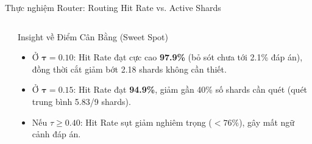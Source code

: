 \documentclass[aspectratio=169,10pt]{beamer}
\begin{document}
\begin{frame}{Thực nghiệm Router: Routing Hit Rate vs. Active Shards}
\small
\begin{columns}[T]
\begin{column}{0.55\textwidth}
\begin{table}[h]
\centering
{}
\caption{Bảng đánh giá Tradeoff giữa Routing Hit Rate và Không gian Shard kích hoạt.}
\end{table}
\end{column}

\begin{column}{0.43\textwidth}
\begin{block}{Insight về Điểm Cân Bằng (Sweet Spot)}
\begin{itemize}
    \item Ở $\mathbf{\tau=0.10}$: Hit Rate đạt cực cao \textbf{97.9\%} (bỏ sót chưa tới 2.1\% đáp án), đồng thời cắt giảm bớt 2.18 shards không cần thiết.
    \item Ở $\mathbf{\tau=0.15}$: Hit Rate đạt \textbf{94.9\%}, giảm gần 40\% số shards cần quét (quét trung bình 5.83/9 shards).
    \item Nếu $\tau \ge 0.40$: Hit Rate sụt giảm nghiêm trọng ($<76\%$), gây mất ngữ cảnh đáp án.
\end{itemize}
\end{block}
\end{column}
\end{columns}
\end{frame}
\end{document}

